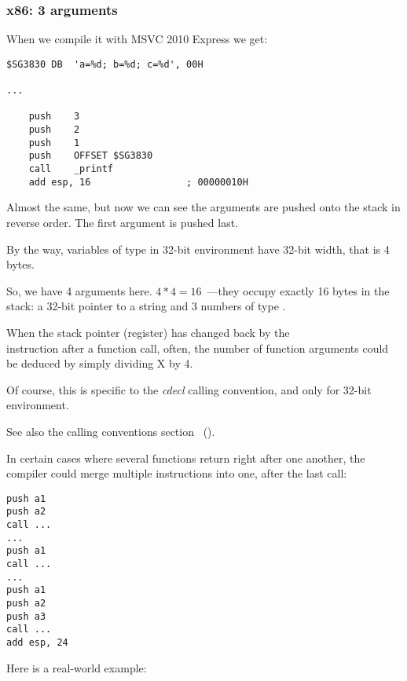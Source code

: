 \subsubsection{x86: 3 arguments}


When we compile it with MSVC 2010 Express we get:

\begin{lstlisting}[style=customasmx86]
$SG3830	DB	'a=%d; b=%d; c=%d', 00H

...

	push	3
	push	2
	push	1
	push	OFFSET $SG3830
	call	_printf
	add	esp, 16					; 00000010H
\end{lstlisting}

Almost the same, but now we can see the \printf arguments are pushed onto the stack in reverse order. The first argument is pushed last.

By the way, variables of \Tint type in 32-bit environment have 32-bit width, that is 4 bytes.

So, we have 4 arguments here. $4*4 = 16$~---they occupy exactly 16 bytes in the stack: a 32-bit pointer to a string and 3 numbers of type \Tint.

When the \gls{stack pointer} (\ESP register) has changed back by the\\
 instruction after a function call, often,
the number of function arguments could be deduced by simply dividing X by 4.

Of course, this is specific to the \emph{cdecl} calling convention, and only for 32-bit environment.

See also the calling conventions section ~().

In certain cases where several functions return right after one another, the compiler could merge multiple  instructions into one, after the last call:

\begin{lstlisting}[style=customasmx86]
push a1
push a2
call ...
...
push a1
call ...
...
push a1
push a2
push a3
call ...
add esp, 24
\end{lstlisting}

Here is a real-world example:



\clearpage
{}
\myindex{\olly}

